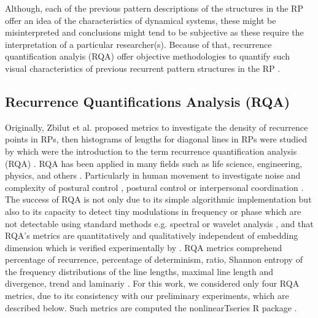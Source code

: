 \documentclass[fleqn,10pt]{wlscirep}
\begin{document}
Although, each of the previous pattern descriptions of the structures in the RP offer an idea of the characteristics of dynamical systems, these might be misinterpreted and conclusions might tend to be subjective as these require the interpretation of a particular researcher(s).
Because of that, recurrence quantification analyis (RQA) offer objective methodologies to quantify such visual characteristics of previous recurrent pattern structures in the RP \cite{zbilut1992}.

\subsection*{Recurrence Quantifications Analysis (RQA)}
Originally, Zbilut et al. \cite{zbilut1992} proposed metrics to investigate the density of recurrence points in RPs, then histograms of lengths for diagonal lines in RPs were studied by \cite{trulla1996} which were the introduction to the term recurrence quantification analysis (RQA) \cite{marwan2008}.
RQA has been applied in many fields such as life science, engineering, physics, and others \cite{marwan2008}. Particularly in human movement to investigate noise and complexity of postural control \cite{rhea2011}, postural control \cite{apthorp2014} or interpersonal coordination \cite{duran2017}.
The success of RQA is not only due to its simple algorithmic implementation but also to its capacity to detect tiny modulations in frequency or phase which are not detectable using standard methods e.g. spectral or wavelet analysis \cite{marwan2011}, and that RQA's metrics are quantitatively and qualitatively independent of embedding dimension which is verified experimentally by \cite{iwanski1998}.
RQA metrics comprehend percentage of recurrence, percentage of determinism, ratio, Shannon entropy of the frequency distributions of the line lengths, maximal line length and divergence, trend and laminariy \cite{marwan2007, marwan2015}.
For this work, we considered only four RQA metrics, due to its consistency with our preliminary experiments, which are described below.
Such metrics are computed the nonlinearTseries R package \cite{nonlinearTseries2016}.
\end{document}
